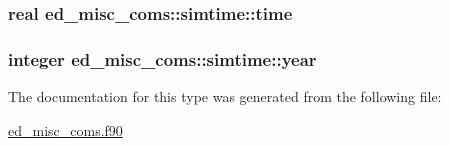 \subsubsection[{time}]{\setlength{\rightskip}{0pt plus 5cm}real ed\+\_\+misc\+\_\+coms\+::simtime\+::time}\label{structed__misc__coms_1_1simtime_af1edf430fdbca01a520e8d813d6f769a}
\hypertarget{structed__misc__coms_1_1simtime_aa33c38e2a4be886fb46a0b41fc3614a9}{}
\subsubsection[{year}]{\setlength{\rightskip}{0pt plus 5cm}integer ed\+\_\+misc\+\_\+coms\+::simtime\+::year}\label{structed__misc__coms_1_1simtime_aa33c38e2a4be886fb46a0b41fc3614a9}


The documentation for this type was generated from the following file\+:\begin{DoxyCompactItemize}
\item 
\hyperlink{ed__misc__coms_8f90}{ed\+\_\+misc\+\_\+coms.\+f90}\end{DoxyCompactItemize}

